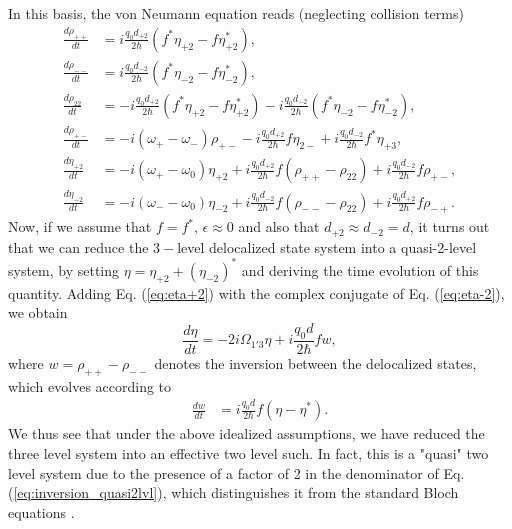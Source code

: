 \documentclass[]{spie}  %
\begin{document}
In this basis, the von Neumann equation reads (neglecting collision terms)
\begin{subequations}
\begin{align}
\frac{d \rho_{++}}{dt} &= i\frac{q_0d_{+2}}{2\hbar}(f^*\eta_{+2}-f\eta_{+2}^*), \\
\frac{d \rho_{--}}{dt} &= i\frac{q_0d_{-2}}{2\hbar}(f^*\eta_{-2}-f\eta_{-2}^*), \\
\frac{d \rho_{22}}{dt} &= -i\frac{q_0d_{+2}}{2\hbar}(f^*\eta_{+2}-f\eta_{+2}^*)-i\frac{q_0d_{-2}}{2\hbar}(f^*\eta_{-2}-f\eta_{-2}^*), \\
\frac{d \rho_{+-}}{dt} &= -i(\omega_+-\omega_-)\rho_{+-}-i\frac{q_0d_{+2}}{2\hbar}f\eta_{2-}+i\frac{q_0d_{-2}}{2\hbar}f^*\eta_{+3},\\
\frac{d \eta_{+2}}{dt} &= -i(\omega_+-\omega_0)\eta_{+2}+i\frac{q_0d_{+2}}{2\hbar}f(\rho_{++}-\rho_{22})+i\frac{q_0d_{-2}}{2\hbar}f\rho_{+-}, \label{eq:eta+2}\\
\frac{d \eta_{-2}}{dt} &= -i(\omega_--\omega_0)\eta_{-2}+i\frac{q_0d_{-2}}{2\hbar}f(\rho_{--}-\rho_{22})+i\frac{q_0d_{+2}}{2\hbar}f\rho_{-+}. \label{eq:eta-2}
\end{align}
\end{subequations}
Now, if we assume that $f = f^*$,  $\epsilon \approx 0$ and also that $d_{+2}\approx d_{-2} = d$, it turns out that we can reduce the $3-$level delocalized state system into a quasi-2-level system, by setting  $\eta = \eta_{+2}+(\eta_{-2})^*$ and deriving the time evolution of this quantity. Adding Eq. (\ref{eq:eta+2}) with the complex conjugate of Eq. (\ref{eq:eta-2}), we obtain
\begin{equation}
\label{eq:coherence_quasi2lvl}
\frac{d \eta}{dt} = -2i\Omega_{1'3} \eta + i\frac{q_0d}{2\hbar}fw, 
\end{equation}
where $w = \rho_{++}-\rho_{--}$ denotes the inversion between the delocalized states, which	 evolves according to 
\begin{align}
\label{eq:inversion_quasi2lvl}
\frac{d w }{dt}	&=  i\frac{q_0d}{2\hbar}f(\eta-\eta^*).
\end{align}
We thus see that under the above idealized assumptions, we have reduced the three level system into an effective two level such. In fact, this is a "quasi" two level system due to the presence of a factor of 2 in the denominator of Eq. (\ref{eq:inversion_quasi2lvl}), which distinguishes it from the standard Bloch equations \cite{boyd2003nonlinear}.
\end{document}
